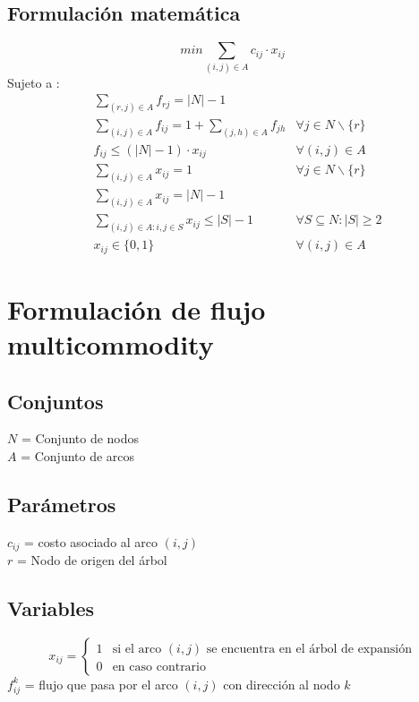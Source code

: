 \documentclass{article}
\numberwithin{equation}{section}
\begin{document}
\subsection{Formulación matemática}
\begin{equation}
min \sum_{(i,j) \in A} c_{ij} \cdot x_{ij}
\end{equation}
Sujeto a : \begin{align}
& \sum_{(r,j) \in A} f_{rj} = |N| - 1\\
& \sum_{(i,j) \in A} f_{ij} = 1 + \sum_{(j,h) \in A} f_{jh} &\forall j \in N \backslash \{r\} \\
& f_{ij} \leq (|N| - 1)\cdot x_{ij} &\forall (i,j) \in A\\
& \sum_{(i,j) \in A} x_{ij} = 1 &\forall j \in N \backslash \{r\}\\
& \sum_{(i,j) \in A} x_{ij} = |N| - 1\\
& \sum_{(i,j) \in A: i,j \in S} x_{ij} \leq |S| - 1 &\forall S \subseteq N : |S| \geq 2 \\
& x_{ij} \in \{0,1\} &\forall (i,j) \in A
\end{align}

\newpage
\section{Formulación de flujo multicommodity}
\subsection{Conjuntos}
$N$ = Conjunto de nodos\\
$A$ = Conjunto de arcos
\subsection{Parámetros}
$c_{ij}$ = costo asociado al arco $(i,j)$\\
$r$ = Nodo de origen del árbol
\subsection{Variables}
\begin{center}
\[x_{ij}={\begin{cases}1&{\mbox{si el arco $(i,j)$ se encuentra en el árbol de expansión}}\\0&{\mbox{en caso contrario}}\end{cases}}
\]
$f_{ij}^k$ = flujo que pasa por el arco $(i,j)$ con dirección al nodo $k$
\end{center}
\end{document}
